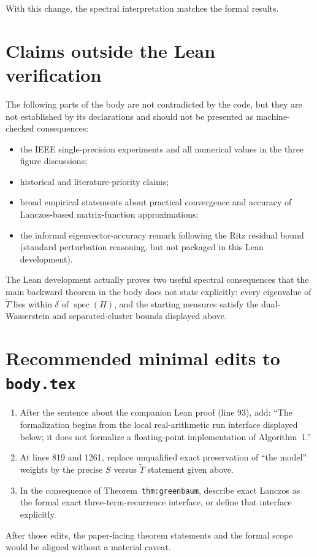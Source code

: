 \documentclass[11pt]{article}
\newcommand{\spec}{\operatorname{spec}}
\begin{document}
With this change, the spectral interpretation matches the formal results.

\section*{Claims outside the Lean verification}

The following parts of the body are not contradicted by the code, but they
are not established by its declarations and should not be presented as
machine-checked consequences:

\begin{itemize}
  \item the IEEE single-precision experiments and all numerical values in the
  three figure discussions;
  \item historical and literature-priority claims;
  \item broad empirical statements about practical convergence and accuracy
  of Lanczos-based matrix-function approximations;
  \item the informal eigenvector-accuracy remark following the Ritz residual
  bound (standard perturbation reasoning, but not packaged in this Lean
  development).
\end{itemize}

The Lean development actually proves two useful spectral consequences that
the main backward theorem in the body does not state explicitly: every
eigenvalue of $\widetilde T$ lies within $\delta$ of $\spec(H)$, and the
starting measures satisfy the dual-Wasserstein and separated-cluster bounds
displayed above.

\section*{Recommended minimal edits to \texttt{body.tex}}

\begin{enumerate}
  \item After the sentence about the companion Lean proof (line 93), add:
  ``The formalization begins from the local real-arithmetic run interface
  displayed below; it does not formalize a floating-point implementation of
  Algorithm~1.''
  \item At lines 819 and 1261, replace unqualified exact preservation of
  ``the model'' weights by the precise $S$ versus $\widetilde T$ statement
  given above.
  \item In the consequence of Theorem~\texttt{thm:greenbaum}, describe exact
  Lanczos as the formal exact three-term-recurrence interface, or define that
  interface explicitly.
\end{enumerate}

After those edits, the paper-facing theorem statements and the formal scope
would be aligned without a material caveat.
\end{document}
